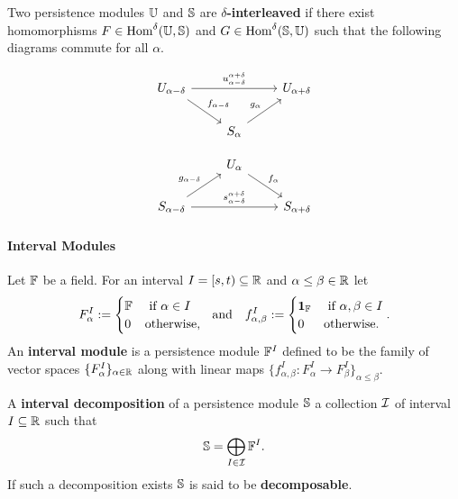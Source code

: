 Two persistence modules $\UU$ and $\S$ are \textbf{$\delta$-interleaved} if there exist homomorphisms $F\in\Hom^\delta(\UU, \S)$ and $G \in\Hom^\delta(\S,\UU)$ such that the following diagrams commute for all $\alpha$.

\begin{minipage}{0.45\textwidth}
\begin{equation}\label{dgm:interleaving1}
  \begin{tikzcd}
    U_{\alpha-\delta}\arrow{rr}{u_{\alpha-\delta}^{\alpha+\delta}}\arrow{dr}{f_{\alpha-\delta}} & &
    U_{\alpha+\delta}\\
    & S_{\alpha}\arrow{ur}{g_\alpha} &
\end{tikzcd}\end{equation}
\end{minipage}
\begin{minipage}{0.45\textwidth}
\begin{equation}\label{dgm:interleaving2}
  \begin{tikzcd}
    & U_{\alpha}\arrow{dr}{f_\alpha} &\\
    S_{\alpha-\delta}\arrow{rr}{s_{\alpha-\delta}^{\alpha+\delta}}\arrow{ur}{g_{\alpha-\delta}} & &
    S_{\alpha+\delta}
\end{tikzcd}\end{equation}
\end{minipage}

\paragraph{Interval Modules}

Let $\FF$ be a field.
For an interval $I = [s,t)\subseteq \R$ and $\alpha\leq\beta\in\R$ let
\[ F_\alpha^I := \begin{cases} \FF&\text{ if } \alpha\in I\\ 0 &\text{otherwise,}\end{cases}\ \text{ and }\ \ f_{\alpha,\beta}^I := \begin{cases} \id_\FF&\text{ if } \alpha,\beta\in I\\ 0&\text{otherwise.}\end{cases}.\]
An \textbf{interval module} is a persistence module $\FF^I$ defined to be the family of vector spaces $\{F_\alpha^I\}_{\alpha\in\R}$ along with linear maps $\{f_{\alpha,\beta}^I : F_\alpha^I\to F_\beta^I\}_{\alpha\leq\beta}$.

A \textbf{interval decomposition} of a persistence module $\S$ a collection $\I$ of interval $I\subseteq\R$ such that
\[ \S = \bigoplus_{I\in \I} \FF^I. \]
If such a decomposition exists $\S$ is said to be \textbf{decomposable}.
